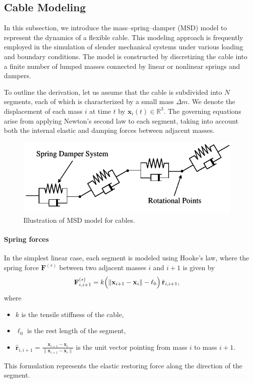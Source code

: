 \documentclass[12pt,twoside,letterpaper]{article}
\begin{document}
\subsection{Cable Modeling}

In this subsection, we introduce the mass--spring--damper (MSD) model to represent the dynamics of a flexible cable. This modeling approach is frequently employed in the simulation of slender mechanical systems under various loading and boundary conditions. The model is constructed by discretizing the cable into a finite number of lumped masses connected by linear or nonlinear springs and dampers.

To outline the derivation, let us assume that the cable is subdivided into \(N\) segments, each of which is characterized by a small mass \(\Delta m\). We denote the displacement of each mass \(i\) at time \(t\) by \(\mathbf{x}_i(t) \in \mathbb{R}^3\). The governing equations arise from applying Newton's second law to each segment, taking into account both the internal elastic and damping forces between adjacent masses.

\begin{figure}[htbp]
  \centering
  \begin{minipage}{0.7\textwidth}
    \centering
    \includegraphics[width=\textwidth]{figures/MSD_model.pdf}
    \caption{Illustration of MSD model for cables.}
    \label{MSD}
  \end{minipage}
\end{figure}


\paragraph{Spring forces}
In the simplest linear case, each segment is modeled using Hooke's law, where the spring force \(\mathbf{F}^{(s)}\) between two adjacent masses \(i\) and \(i+1\) is given by
\begin{equation}
  \mathbf{F}_{i,i+1}^{(s)} 
  = k \Bigl( \|\mathbf{x}_{i+1} - \mathbf{x}_i\| - \ell_0 \Bigr)\,
    \hat{\mathbf{r}}_{i,i+1},
  \label{eq:spring_force}
\end{equation}
where 
\begin{itemize}
  \item \(k\) is the tensile stiffness of the cable,
  \item \(\ell_0\) is the rest length of the segment,
  \item \(\displaystyle \hat{\mathbf{r}}_{i,i+1} 
           = \frac{\mathbf{x}_{i+1} - \mathbf{x}_i}%
                  {\|\mathbf{x}_{i+1} - \mathbf{x}_i\|}\)
        is the unit vector pointing from mass \(i\) to mass \(i+1\).
\end{itemize}
This formulation represents the elastic restoring force along the direction of the segment.
\end{document}
